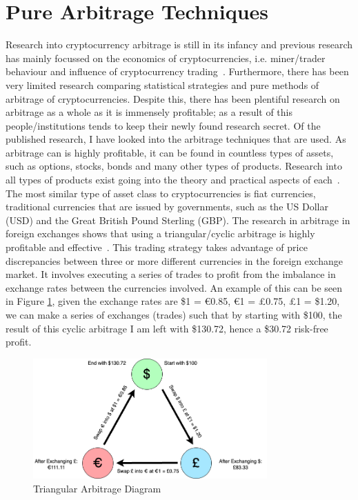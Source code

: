 \section{Pure Arbitrage Techniques}
Research into cryptocurrency arbitrage is still in its infancy and previous research has mainly focussed on the economics of cryptocurrencies, i.e. miner/trader behaviour and influence of cryptocurrency trading~\cite{eyal2015miner, avarikioti2020ride, huberman2021monopoly, athey2016bitcoin, easley2019mining, harvey2016cryptofinance, pagnotta2018equilibrium}. Furthermore, there has been very limited research comparing statistical strategies and pure methods of arbitrage of cryptocurrencies. Despite this, there has been plentiful research on arbitrage as a whole as it is immensely profitable; as a result of this people/institutions tends to keep their newly found research secret. Of the published research, I have looked into the arbitrage techniques that are used. As arbitrage can is highly profitable, it can be found in countless types of assets, such as options, stocks, bonds and many other types of products. Research into all types of products exist going into the theory and practical aspects of each~\cite{mo_theoretical_nodate, 8957853}. The most similar type of asset class to cryptocurrencies is fiat currencies, traditional currencies that are issued by governments, such as the US Dollar (USD) and the Great British Pound Sterling (GBP). The research in arbitrage in foreign exchanges shows that using a triangular/cyclic arbitrage is highly profitable and effective~\cite{akram2008arbitrage, aiba2002triangular, ito2012free}. This trading strategy takes advantage of price discrepancies between three or more different currencies in the foreign exchange market. It involves executing a series of trades to profit from the imbalance in exchange rates between the currencies involved. An example of this can be seen in Figure \ref{fig:tri-arb}, given the exchange rates are \$1 = \euro 0.85, \euro 1 = \pounds0.75, \pounds1 = \$1.20, we can make a series of exchanges (trades) such that by starting with \$100, the result of this cyclic arbitrage I am left with \$130.72, hence a \$30.72 risk-free profit.

\begin{figure}[!htb]
    \centering
    \includegraphics[width=0.8\textwidth]{background/Images/arbitrage_diagram.png}
    \caption{Triangular Arbitrage Diagram\label{fig:tri-arb}}
\end{figure}

